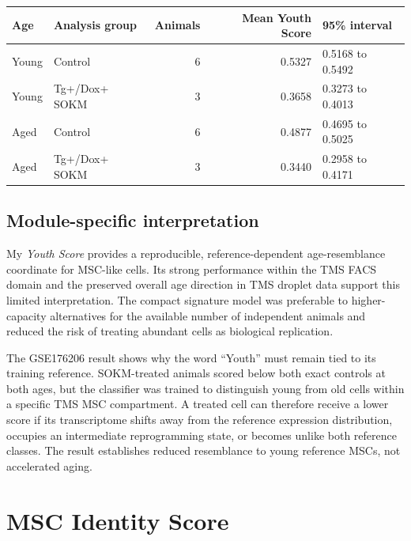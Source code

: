 \documentclass[10pt,twocolumn]{article}
\newcommand{\YouthScore}{\textit{Youth Score}}
\newcommand{\SOKM}{SOKM}
\begin{document}
\begin{strip}
\noindent\begin{minipage}{\textwidth}
\centering
{}
\label{tab:youth-gse}
\begin{tabular}{llrrl}
\toprule
Age & Analysis group & Animals & Mean Youth Score & 95\% interval \\
\midrule
Young & Control & 6 & 0.5327 & 0.5168 to 0.5492 \\
Young & Tg+/Dox+ \SOKM & 3 & 0.3658 & 0.3273 to 0.4013 \\
Aged & Control & 6 & 0.4877 & 0.4695 to 0.5025 \\
Aged & Tg+/Dox+ \SOKM & 3 & 0.3440 & 0.2958 to 0.4171 \\
\bottomrule
\end{tabular}
\end{minipage}
\end{strip}

\subsection{Module-specific interpretation}

My \YouthScore{} provides a reproducible, reference-dependent age-resemblance coordinate for MSC-like cells. Its strong performance within the TMS FACS domain and the preserved overall age direction in TMS droplet data support this limited interpretation. The compact signature model was preferable to higher-capacity alternatives for the available number of independent animals and reduced the risk of treating abundant cells as biological replication.

The GSE176206 result shows why the word ``Youth'' must remain tied to its training reference. \SOKM-treated animals scored below both exact controls at both ages, but the classifier was trained to distinguish young from old cells within a specific TMS MSC compartment. A treated cell can therefore receive a lower score if its transcriptome shifts away from the reference expression distribution, occupies an intermediate reprogramming state, or becomes unlike both reference classes. The result establishes reduced resemblance to young reference MSCs, not accelerated aging.

\section{MSC Identity Score}
\end{document}
